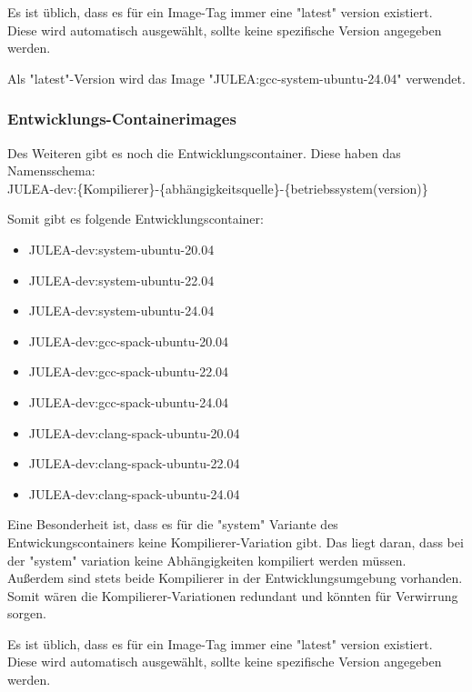 Es ist üblich, dass es für ein Image-Tag immer eine "latest" version existiert. Diese wird automatisch ausgewählt, sollte keine spezifische Version angegeben werden.

Als "latest"-Version wird das Image "JULEA:gcc-system-ubuntu-24.04" verwendet. 

\subsubsection{Entwicklungs-Containerimages}

Des Weiteren gibt es noch die Entwicklungscontainer. Diese haben das Namensschema: \\
JULEA-dev:\{Kompilierer\}-\{abhängigkeitsquelle\}-\{betriebssystem(version)\}

Somit gibt es folgende Entwicklungscontainer:

\begin{multicols}{2}
    \begin{itemize}
        \item JULEA-dev:system-ubuntu-20.04  
        \item JULEA-dev:system-ubuntu-22.04  
        \item JULEA-dev:system-ubuntu-24.04  
        \item JULEA-dev:gcc-spack-ubuntu-20.04   
        \item JULEA-dev:gcc-spack-ubuntu-22.04   
        \item JULEA-dev:gcc-spack-ubuntu-24.04   
        \item JULEA-dev:clang-spack-ubuntu-20.04 
        \item JULEA-dev:clang-spack-ubuntu-22.04 
        \item JULEA-dev:clang-spack-ubuntu-24.04 
    \end{itemize} 
\end{multicols}

Eine Besonderheit ist, dass es für die "system" Variante des Entwickungscontainers keine Kompilierer-Variation gibt. Das liegt daran, dass bei der "system" variation keine Abhängigkeiten kompiliert werden müssen. Außerdem sind stets beide Kompilierer in der Entwicklungsumgebung vorhanden. Somit wären die Kompilierer-Variationen redundant und könnten für Verwirrung sorgen. 

Es ist üblich, dass es für ein Image-Tag immer eine "latest" version existiert. Diese wird automatisch ausgewählt, sollte keine spezifische Version angegeben werden.

